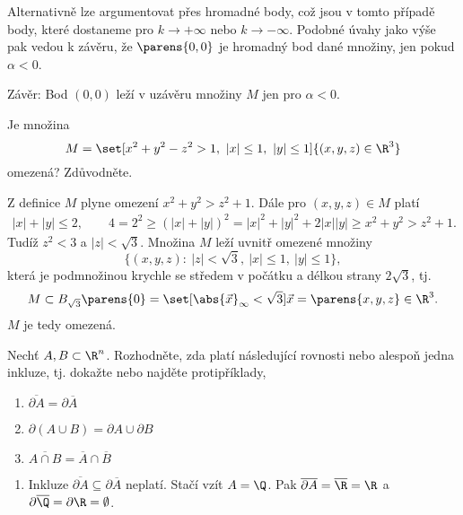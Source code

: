 \documentclass[answers]{exam}
\begin{document}
\begin{questions}
\begin{solution}
		Alternativně lze argumentovat přes hromadné body, což jsou v tomto případě body, které dostaneme pro $k \to +\infty$ nebo $k \to -\infty$. Podobné úvahy jako výše pak vedou k závěru, že $\parens{0, 0}$ je hromadný bod dané množiny, jen pokud $\alpha < 0$. 
		
		Z\'av\v er: Bod $(0,0)$ le\v z\'i v uz\'av\v eru mno\v ziny $M$ jen pro $\alpha<0$.
		
  \end{solution}
  
  \question
  Je množina 
  \begin{equation*}
  	M = \set[x^2+y^2-z^2>1,\ |x|\le1,\ |y|\le1]{(x,y,z)\in \R^3}
  \end{equation*}
  omezená? Zdůvodněte.
	
	\begin{solution}
		Z definice $M$ plyne omezen\'i $x^2+y^2>z^2+1$. D\'ale pro $(x,y,z)\in M$ plat\'i  
		\begin{align*}
		|x|+|y|\le2,\qquad 4=2^2\ge (|x|+|y|)^2=|x|^2+|y|^2+2|x||y|\ge x^2+y^2>z^2+1.
		\end{align*}
		Tud\'i\v z $z^2<3$ a $|z|<\sqrt3$. Mno\v zina $M$ le\v z\'i uvnit\v r omezen\'e mno\v ziny 
		$$\{(x,y,z):\ |z|<\sqrt3,\ |x|\le1,\ |y|\le1\},$$
		která je podmnožinou krychle se středem v počátku a délkou strany $2\sqrt{3}$, tj. 
		\begin{equation*}
			M \subset B_{\sqrt{3}}\parens{0} = \set[{\abs{\vec{x}}}_{\infty} < \sqrt{3}]{\vec{x} = \parens{x, y, z} \in \R^3}.
		\end{equation*}
		$M$ je tedy omezená.
	\end{solution}
	
	\question
	Nechť $A,B\subset \R^n$. Rozhodn\v ete, zda plat\'i n\'asleduj\'ic\'i rovnosti nebo alespo\v n jedna inkluze, tj. doka\v zte nebo najd\v ete protip\v r\'iklady,
	\begin{enumerate}[label=(\roman*)]
		\item $\overline{\partial A}=\partial \overline{A}$
		\item $\partial (A\cup B)=\partial A\cup\partial B$
		\item $\overline{A\cap B}=\overline A\cap\overline B$
	\end{enumerate}
	
	\begin{solution}
		\begin{enumerate}[label=(\roman*)]
			\item 
				Inkluze $\overline{\partial A}\subseteq{\partial \overline A}$ neplat\'i. Sta\v c\'i vz\'it $A=\Q$. Pak $\overline{\partial A}=\overline\R=\R$ a $\partial\overline\Q=\partial\R=\emptyset$.
				

\end{enumerate}
\end{solution}
\end{questions}
\end{document}
